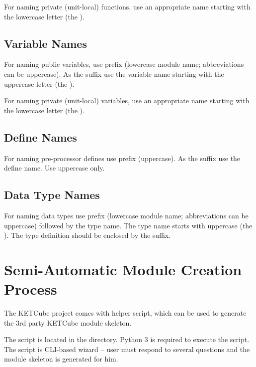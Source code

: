 For naming private (unit-local) functions, use an appropriate name starting with the lowercase letter (the ).

\clearpage
\subsection*{Variable Names}
For naming public variables, use  prefix (lowercase module name; abbreviations can be uppercase). As the suffix use the variable name starting with the uppercase letter (the ).

For naming private (unit-local) variables, use an appropriate name starting with the lowercase letter (the ).

\subsection*{Define Names}
For naming pre-processor defines use  prefix (uppercase). As the suffix use the define name. Use uppercase only.

\subsection*{Data Type Names}
For naming data types use  prefix (lowercase module name; abbreviations can be uppercase) followed by the type name. The type name starts with uppercase (the ). The type definition should be enclosed by the  suffix.

\clearpage
\section{Semi-Automatic Module Creation Process}
The KETCube project comes with helper script, which can be used to generate the 3rd party KETCube module skeleton. 

The script is located in the  directory. Python 3 is required to execute the script. 
The script is CLI-based wizard -- user must respond to several questions and the module skeleton is generated for him.

